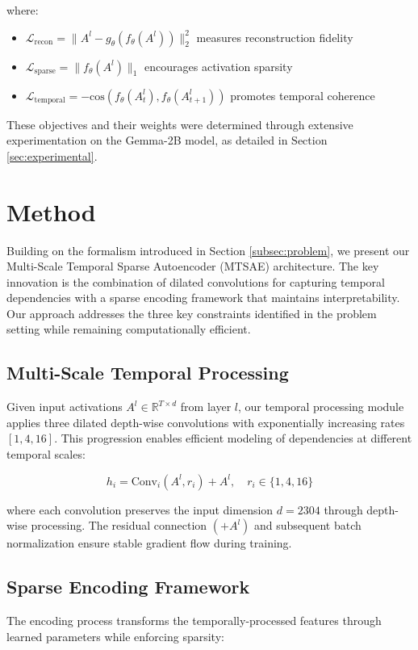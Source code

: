 \documentclass{article} %
\begin{document}
where:
\begin{itemize}
    \item $\mathcal{L}_\text{recon} = \|A^l - g_\theta(f_\theta(A^l))\|_2^2$ measures reconstruction fidelity
    \item $\mathcal{L}_\text{sparse} = \|f_\theta(A^l)\|_1$ encourages activation sparsity
    \item $\mathcal{L}_\text{temporal} = -\text{cos}(f_\theta(A^l_t), f_\theta(A^l_{t+1}))$ promotes temporal coherence
\end{itemize}

These objectives and their weights were determined through extensive experimentation on the Gemma-2B model, as detailed in Section \ref{sec:experimental}.

\section{Method}
\label{sec:method}

Building on the formalism introduced in Section \ref{subsec:problem}, we present our Multi-Scale Temporal Sparse Autoencoder (MTSAE) architecture. The key innovation is the combination of dilated convolutions for capturing temporal dependencies with a sparse encoding framework that maintains interpretability. Our approach addresses the three key constraints identified in the problem setting while remaining computationally efficient.

\subsection{Multi-Scale Temporal Processing}
\label{subsec:temporal}
Given input activations $A^l \in \mathbb{R}^{T \times d}$ from layer $l$, our temporal processing module applies three dilated depth-wise convolutions with exponentially increasing rates $[1,4,16]$. This progression enables efficient modeling of dependencies at different temporal scales:

\begin{equation}
h_i = \text{Conv}_i(A^l, r_i) + A^l, \quad r_i \in \{1,4,16\}
\end{equation}

where each convolution preserves the input dimension $d=2304$ through depth-wise processing. The residual connection $(+A^l)$ and subsequent batch normalization ensure stable gradient flow during training.

\subsection{Sparse Encoding Framework}
\label{subsec:encoding}
The encoding process transforms the temporally-processed features through learned parameters while enforcing sparsity:
\end{document}
